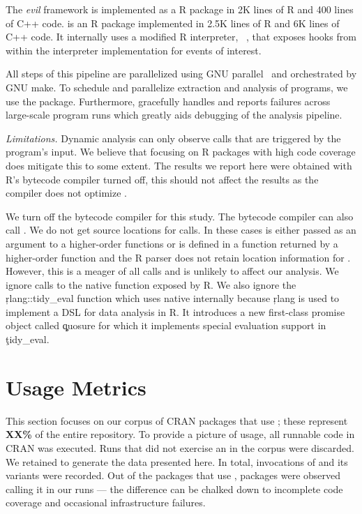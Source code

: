 \documentclass[USenglish,cleveref, autoref, thm-restate]{lipics-v2019}
\newcommand{\mypara}[1]{\medskip\noindent\emph{#1}\xspace}
\begin{document}
The \emph{evil} framework is implemented as a R package in 2K lines of
R and 400 lines of C++ code. \instrumentr is an R package implemented
in 2.5K lines of R and 6K lines of C++ code. It internally uses a
modified R interpreter, \rdyntrace~\cite{oopsla19a}, that exposes
hooks from within the interpreter implementation for events of
interest.

All steps of this pipeline are parallelized using GNU
parallel~\cite{GNUparallel} and orchestrated by GNU make. To schedule
and parallelize extraction and analysis of programs, we use the \runr
package. Furthermore, \runr gracefully handles and reports failures
across large-scale program runs which greatly aids debugging of the
analysis pipeline.



\mypara{Limitations.} Dynamic analysis can only observe
calls that are triggered by the program's input. We believe that
focusing on R packages with high code coverage does mitigate this to
some extent. The results we report here were obtained with R's
bytecode compiler turned off, this should not affect the results as
the compiler does not optimize \eval.


We turn off the bytecode compiler for this study. The bytecode
compiler can also call \eval. We do not get source locations for
\UndefinedEvalsRnd \eval calls. In these cases \eval is either passed
as an argument to a higher-order functions or is defined in a function
returned by a higher-order function and the R parser does not retain
location information for \eval. However, this is a meager
\PercentUndefinedEval of all \eval calls and is unlikely to affect our
analysis. We ignore calls to the native \eval function exposed by R.
We also ignore the \c{rlang::tidy_eval} function which uses native
\eval internally because \c{rlang} is used to implement a DSL for data
analysis in R. It introduces a new first-class promise object called
\c{quosure} for which it implements special evaluation support in
\c{tidy_eval}.

\newpage
\section{Usage Metrics}

This section focuses on our corpus of \Corpus CRAN packages that use
\eval; these represent {\bf XX\%} of the entire repository. To provide
a picture of \eval usage, all runnable code in CRAN was executed. Runs
that did not exercise an \eval in the corpus were discarded. We
retained \Nbruns to generate the data presented here. In total,
\Allcalls invocations of \eval and its variants were recorded. Out of
the \Staticatleastonecallsite packages that use \eval, \Triggeredpkgs
packages were observed calling it in our runs --- the difference can
be chalked down to incomplete code coverage and occasional
infrastructure failures.
\end{document}
